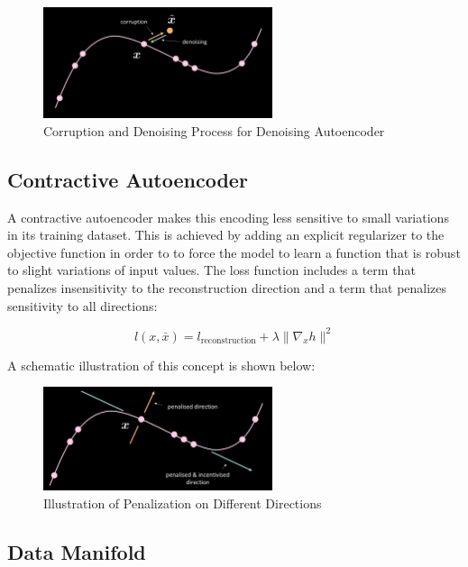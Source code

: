 \begin{figure}[htb]
    \centering
    \includegraphics[width=0.6\textwidth]{figs/Corrpution_and_Denoising.png}
    \caption{Corruption and Denoising Process for Denoising Autoencoder}
    \label{fig:Corrpution_and_Denoising}
\end{figure}

\subsection{Contractive Autoencoder}

A contractive autoencoder makes this encoding less sensitive to small variations in its training dataset. This is achieved by adding an explicit regularizer to the objective function in order to to force the model to learn a function that is robust to slight variations of input values. The loss function includes a term that penalizes insensitivity to the reconstruction direction and a term that penalizes sensitivity to all directions:

$$l(x,\bar{x}) = l_{\text{reconstruction}} + \lambda \| \nabla_x h \|^2$$

A schematic illustration of this concept is shown below: 

\begin{figure}[H]
    \centering
    \includegraphics[width=0.6\textwidth]{figs/Contractive_AutoEncoder.png}
    \caption{Illustration of Penalization on Different Directions}
    \label{fig:Contractive_AutoEncoder}
\end{figure}

\subsection{Data Manifold}

